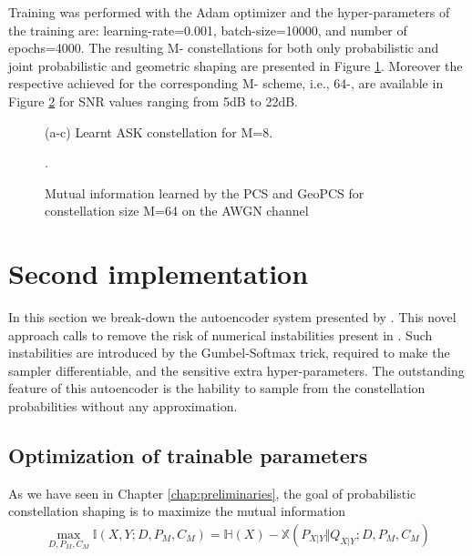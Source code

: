 Training was performed with the Adam optimizer and the hyper-parameters of the training are: learning-rate=0.001, batch-size=10000, and number of epochs=4000.
The resulting M- constellations for both only probabilistic and joint probabilistic and geometric shaping are presented in Figure \ref{fig:starkMASK}. Moreover the respective achieved  for the corresponding M- scheme, i.e., 64-, are available in Figure \ref{fig:starkPerf} for SNR values ranging from 5dB to 22dB.
	
\begin{figure}[h]
	\subfigure[SNR = 5dB]{
         \scalebox{1}{}
         \label{subfig:stark5dB}
    }
    \subfigure[SNR = 12dB]{
         \scalebox{1}{}
         \label{subfig:stark12dB}
    }
    \subfigure[SNR = 18dB]{
         \scalebox{1}{}
         \label{subfig:stark18dB}
    }
    \caption{(a-c) Learnt ASK constellation for M=8.}
    \label{fig:starkMASK}
\end{figure}

\begin{figure}[H]
	\centering
	\subfigure{
		
		\label{subfig:starkPerf}
	}
	\subfigure{
		\scalebox{0.8}{}
%		
		\label{subfig:starkPerfZoom}
	}
    \caption{ Mutual information learned by the PCS and GeoPCS for constellation size M=64 on the AWGN channel}.
    \label{fig:starkPerf}
\end{figure}


\section{Second implementation}
In this section we break-down the autoencoder system presented by \citet{Aref}. This novel approach calls to remove the risk of numerical instabilities present in \cite{Stark}. Such instabilities are introduced by the Gumbel-Softmax trick, required to make the sampler differentiable, and the sensitive extra hyper-parameters. The outstanding feature of this autoencoder is the hability to sample from the constellation probabilities without any approximation.

\subsection{Optimization of trainable parameters}
\label{sec:parameters}
As we have seen in Chapter \ref{chap:preliminaries}, the goal of probabilistic constellation shaping is to maximize the mutual information
\begin{align}
	 \max_{D, P_M, C_M} \mathbb{I} \left(X , Y ; D, P_M, C_M \right) = \mathbb{H}(X) - \mathbb{X}(P_{X|Y} \Vert Q_{X|Y} ; D, P_M, C_M)
\end{align}

